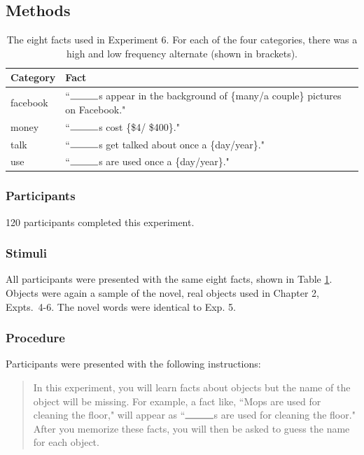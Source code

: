 \subsection{Methods}

\begin{table}[t!]
\centering

\begin{tabular}{ll}
\toprule
\textbf{Category} & \textbf{Fact}               \\
\toprule
   facebook & ``$\rule{1cm}{0.15mm}$s appear in the background of \{many/a couple\} pictures on Facebook."\\
   money  &  ``$\rule{1cm}{0.15mm}$s cost \{\$4/ \$400\}."   \\
   talk  & ``$\rule{1cm}{0.15mm}$s get talked about once a \{day/year\}." \\
   use    & ``$\rule{1cm}{0.15mm}$s are used once a \{day/year\}."                             \\

 \bottomrule
\end{tabular}
\caption{The eight facts used in Experiment 6. For each of the four categories, there was a high and low frequency alternate (shown in  brackets).}
\label{tab:facts}
\end{table}

\subsubsection{Participants} 
120 participants completed this experiment. 

\subsubsection{Stimuli} 
All participants were presented with the same eight facts, shown in Table \ref{tab:facts}. Objects were again a sample of the novel, real objects used in Chapter 2, Expts.\ 4-6.  The novel words were identical to Exp. 5.

\subsubsection{Procedure}
Participants were presented with the following instructions:

\begin{quote}
In this experiment, you will learn facts about objects but the name of the object will be missing. For example, a fact like, ``Mops are used for cleaning the floor," will appear as ``$\rule{1cm}{0.15mm}$s are used for cleaning the floor." After you memorize these facts, you will then be asked to guess the name for each object. 
\end{quote}

